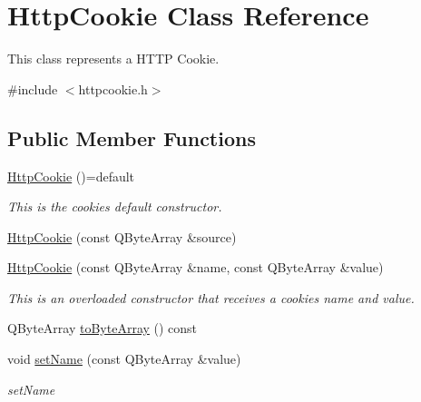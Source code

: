 \hypertarget{class_http_cookie}{}\section{Http\+Cookie Class Reference}
\label{class_http_cookie}


This class represents a H\+T\+TP Cookie.  




{\ttfamily \#include $<$httpcookie.\+h$>$}

\subsection*{Public Member Functions}
\begin{DoxyCompactItemize}
\item 
\mbox{\label{class_http_cookie_a728bef99b74d352b1762cc98e67cc93c}} 
\hyperlink{class_http_cookie_a728bef99b74d352b1762cc98e67cc93c}{Http\+Cookie} ()=default
\begin{DoxyCompactList}\small\item\em This is the cookie\textquotesingle{}s default constructor. \end{DoxyCompactList}\item 
\hyperlink{class_http_cookie_aeb0f2cb5f7e8ef2fc7503663e29941c4}{Http\+Cookie} (const Q\+Byte\+Array \&source)
\item 
\hyperlink{class_http_cookie_a2037d1e3f9a6f65f0f3575df1cfcc200}{Http\+Cookie} (const Q\+Byte\+Array \&name, const Q\+Byte\+Array \&value)
\begin{DoxyCompactList}\small\item\em This is an overloaded constructor that receives a cookie\textquotesingle{}s name and value. \end{DoxyCompactList}\item 
Q\+Byte\+Array \hyperlink{class_http_cookie_aef937847dbebf7290e94b94afbb8f9a1}{to\+Byte\+Array} () const
\item 
\mbox{\label{class_http_cookie_a6e945e17601c69011a71b8a1d56f202b}} 
void \hyperlink{class_http_cookie_a6e945e17601c69011a71b8a1d56f202b}{set\+Name} (const Q\+Byte\+Array \&value)
\begin{DoxyCompactList}\small\item\em set\+Name \end{DoxyCompactList}\item 

\end{DoxyCompactItemize}
